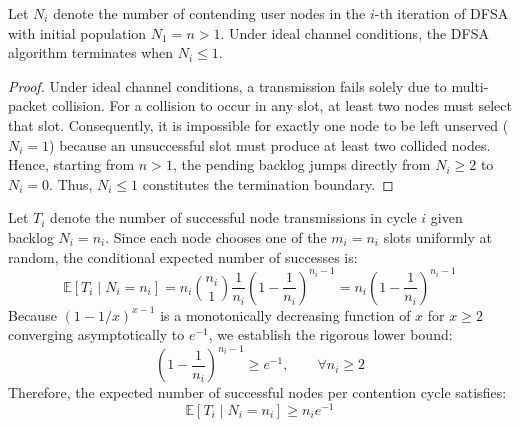 \begin{lemma}
\label{lem:dfsa_terminal}
Let $N_i$ denote the number of contending user nodes in the $i$-th iteration of DFSA with initial population $N_1 = n > 1$. Under ideal channel conditions, the DFSA algorithm terminates when $N_i \le 1$.
\end{lemma}
\begin{proof}
Under ideal channel conditions, a transmission fails solely due to multi-packet collision. For a collision to occur in any slot, at least two nodes must select that slot. Consequently, it is impossible for exactly one node to be left unserved ($N_i = 1$) because an unsuccessful slot must produce at least two collided nodes. Hence, starting from $n > 1$, the pending backlog jumps directly from $N_i \ge 2$ to $N_i = 0$. Thus, $N_i \le 1$ constitutes the termination boundary.
\end{proof}

Let $T_i$ denote the number of successful node transmissions in cycle $i$ given backlog $N_i = n_i$. Since each node chooses one of the $m_i = n_i$ slots uniformly at random, the conditional expected number of successes is:
\begin{equation}
    \label{eq:dfsa_E_Ti}
    \mathbb{E}[T_i \mid N_i = n_i] = n_i \binom{n_i}{1} \frac{1}{n_i} \left( 1 - \frac{1}{n_i} \right)^{n_i - 1} = n_i \left( 1 - \frac{1}{n_i} \right)^{n_i - 1}
\end{equation}
Because $(1 - 1/x)^{x-1}$ is a monotonically decreasing function of $x$ for $x \ge 2$ converging asymptotically to $e^{-1}$, we establish the rigorous lower bound:
\begin{equation}
    \label{eq:dfsa_e_bound}
    \left( 1 - \frac{1}{n_i} \right)^{n_i - 1} \ge e^{-1}, \qquad \forall n_i \ge 2
\end{equation}
Therefore, the expected number of successful nodes per contention cycle satisfies:
\begin{equation}
    \mathbb{E}[T_i \mid N_i = n_i] \ge n_i e^{-1}
\end{equation}

